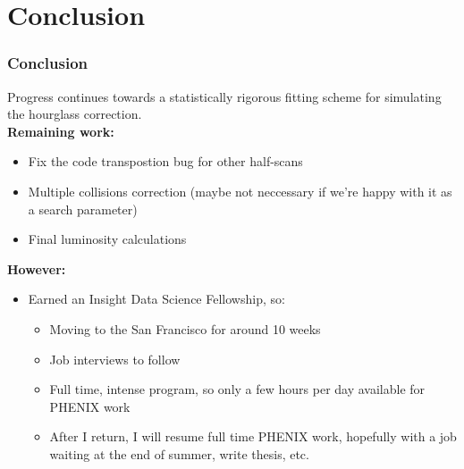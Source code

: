 \section{Conclusion}

\begin{frame}
\frametitle{Conclusion}
Progress continues towards a statistically rigorous fitting scheme for
simulating the hourglass correction. \\ 
\textbf{Remaining work:}
\begin{itemize}
  \item Fix the code transpostion bug for other half-scans
	\item Multiple collisions correction (maybe not neccessary if we're happy
		with it as a search parameter)
	\item Final luminosity calculations
\end{itemize}
\textbf{However:}
\begin{itemize}
  \item Earned an Insight Data Science Fellowship, so:
	\begin{itemize}
	  \item Moving to the San Francisco for around 10 weeks
		\item Job interviews to follow
		\item Full time, intense program, so only a few hours per day available for
			PHENIX work 
		\item After I return, I will resume full time PHENIX work, hopefully with a
			job waiting at the end of summer, write thesis, etc.
	\end{itemize}
\end{itemize}
\end{frame}
